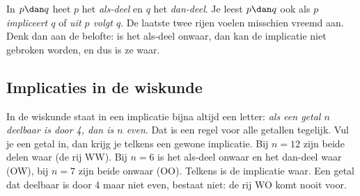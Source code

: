In $p \dan q$ heet $p$ het \textit{als-deel} en $q$ het \textit{dan-deel}. Je leest $p \dan q$ ook als \textit{$p$ impliceert $q$} of \textit{uit $p$ volgt $q$}. De laatste twee rijen voelen misschien vreemd aan. Denk dan aan de belofte: is het als-deel onwaar, dan kan de implicatie niet gebroken worden, en dus is ze waar.



\begin{oefeningen}
\end{oefeningen}

\subsection{Implicaties in de wiskunde}

In de wiskunde staat in een implicatie bijna altijd een letter: \textit{als een getal $n$ deelbaar is door 4, dan is $n$ even}. Dat is een regel voor alle getallen tegelijk. Vul je een getal in, dan krijg je telkens een gewone implicatie. Bij $n = 12$ zijn beide delen waar (de rij WW). Bij $n = 6$ is het als-deel onwaar en het dan-deel waar (OW), bij $n = 7$ zijn beide onwaar (OO). Telkens is de implicatie waar. Een getal dat deelbaar is door 4 maar niet even, bestaat niet: de rij WO komt nooit voor.

